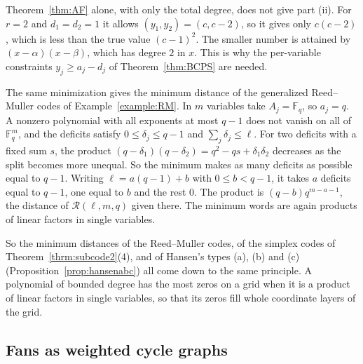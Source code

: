 \documentclass[12pt,letterpaper]{article}
\numberwithin{equation}{section}
\theoremstyle{definition}
\theoremstyle{remark}
\newcommand{\Fq}{\mathbb{F}_q}
\newcommand{\RM}{\mathcal{R}}
\begin{document}
Theorem~\ref{thm:AF} alone, with only the total degree, does not give part
(ii). For $r=2$ and $d_1=d_2=1$ it allows $(y_1,y_2)=(c,c-2)$, so it gives
only $c(c-2)$, which is less than the true value $(c-1)^2$. The smaller
number is attained by $(x-\alpha)(x-\beta)$, which has degree $2$ in $x$.
This is why the per-variable constraints $y_j\ge a_j-d_j$ of
Theorem~\ref{thm:BCPS} are needed.

The same minimization gives the minimum distance of the generalized
Reed--Muller codes of Example~\ref{example:RM}. In $m$ variables take
$A_j=\Fq$, so $a_j=q$. A nonzero polynomial with all exponents at most $q-1$
does not vanish on all of $\Fq^m$, and the deficits satisfy $0\le\delta_j\le q-1$ and $\sum_j\delta_j\le\ell$.
For two deficits with a fixed sum $s$, the product
$(q-\delta_1)(q-\delta_2)=q^2-qs+\delta_1\delta_2$ decreases as the split
becomes more unequal. So the minimum makes as many deficits as possible equal
to $q-1$. Writing $\ell=a(q-1)+b$ with $0\le b<q-1$, it takes $a$ deficits
equal to $q-1$, one equal to $b$ and the rest $0$. The product is
$(q-b)q^{m-a-1}$, the distance of $\RM(\ell,m,q)$ given there. The minimum
words are again products of linear factors in single variables.

So the minimum distances of the Reed--Muller codes, of the simplex codes of
Theorem~\ref{thrm:subcode2}(4), and of Hansen's types (a), (b) and (c)
(Proposition~\ref{prop:hansenabc}) all come down to the same principle. A
polynomial of bounded degree has the most zeros on a grid when it is a
product of linear factors in single variables, so that its zeros fill whole
coordinate layers of the grid.

\subsection{Fans as weighted cycle graphs}\label{sec:fangraph}
\end{document}
